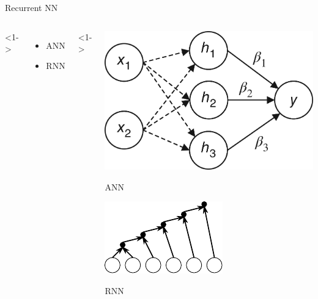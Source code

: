\begin{xframe}{Recurrent NN}

    \begin{columns}
        <1->
        \begin{itemize}
            \item {ANN\\
            }

            \vspace{3em}

            \item {RNN\\
            }
        \end{itemize}
        <1->
        \begin{center}
            \includegraphics[height=0.3\textheight]{./style/images/fc.png}

            ANN

            \includegraphics[height=0.3\textheight]{./style/images/rnn.pdf}

            RNN
        \end{center}

    \end{columns}
\end{xframe}

